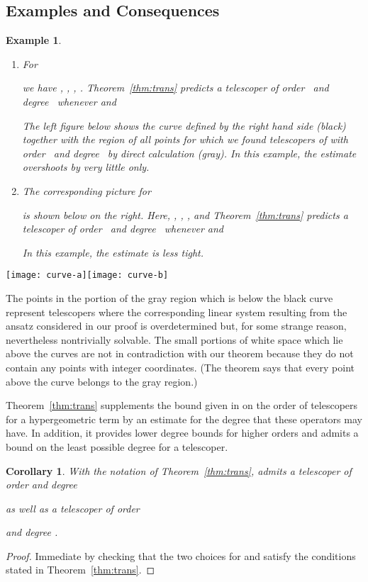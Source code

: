 \documentclass{sig-alternate}
\newtheorem{corollary}[theorem]{Corollary}
\newtheorem{example}[theorem]{Example}
\begin{document}
\subsection{Examples and Consequences}

\begin{example}\label{ex:trans}
\begin{enumerate}
\item For
  
  we have , , , . Theorem~\ref{thm:trans} predicts
  a telescoper of order~ and degree~ whenever  and
  
  The left figure below shows the curve defined by the right hand side (black) together with
  the region of all points  for which we found telescopers of  with order~
  and degree~ by direct calculation (gray).
  In this example, the estimate overshoots by very little only.
\item The corresponding picture for
  
  is shown below on the right. Here, , , ,  and
  Theorem~\ref{thm:trans} predicts a telescoper of order~ and degree~ whenever 
  and
  
  In this example, the estimate is less tight.



\end{enumerate}
\end{example}

\centerline{\texttt{[image: curve-a]}\hfil\texttt{[image: curve-b]}}

\medskip

The points  in the portion of the gray region which is below the black curve
represent telescopers where the corresponding linear system resulting from the ansatz considered
in our proof is overdetermined but, for some strange reason, nevertheless nontrivially solvable. 
The small portions of white space which lie above the curves are not in contradiction with our 
theorem because they do not contain any points with integer coordinates. (The theorem says that
every point  above the curve belongs to the gray region.)

Theorem~\ref{thm:trans} supplements the bound given in \cite{mohammed05} on the order
of telescopers for a hypergeometric term by an estimate for the degree that these
operators may have. In addition, it provides lower degree bounds for higher orders
and admits a bound on the least possible degree for a telescoper.

\begin{corollary}
  With the notation of Theorem~\ref{thm:trans},  admits a telescoper of
  order  and degree
  
  as well as a telescoper of order
  
  and degree .
\end{corollary}
\begin{proof}
  Immediate by checking that the two choices for  and  satisfy the conditions
  stated in Theorem~\ref{thm:trans}.
\end{proof}
\end{document}
